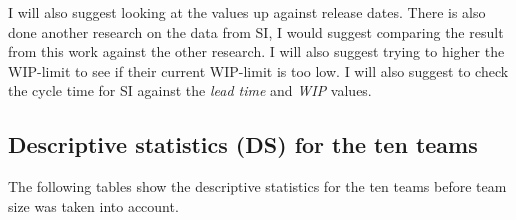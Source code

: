 \documentclass[UKenglish]{ifimaster}  %
\begin{document}
I will also suggest looking at the values up against release dates. There is also done another research on the data from SI, I would suggest comparing the result from this work against the other research. I will also suggest trying to higher the WIP-limit to see if their current WIP-limit is too low.
I will also suggest to check the cycle time for SI against the \textit{lead time} and \textit{WIP} values. 


\begin{appendices}
\chapter{Descriptive statistics (DS) for the ten teams}
\label{app:DS}
The following tables show the descriptive statistics for the ten teams before team size was taken into account.

\end{appendices}
\end{document}
